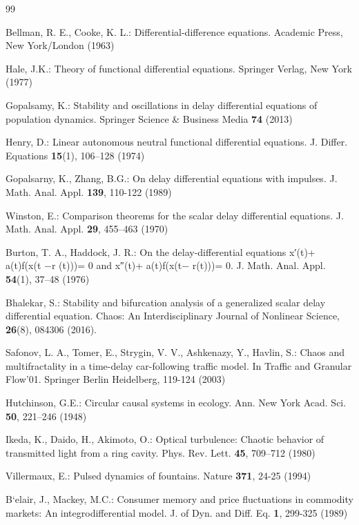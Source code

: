 \documentclass[12pt]{article}
\numberwithin{equation}{section}
\begin{document}
\begin{thebibliography}{99}

 Bellman, R. E., Cooke, K. L.: Differential-difference equations. Academic Press, New York/London (1963)

 Hale, J.K.: Theory of functional differential equations. Springer Verlag,
New York (1977)

 Gopalsamy, K.: Stability and oscillations in delay differential equations of population dynamics. Springer Science \& Business Media \textbf{74} (2013)

 Henry, D.: Linear autonomous neutral functional differential equations. J. Differ. Equations \textbf{15}(1), 106--128 (1974)

 Gopalsarny, K., Zhang, B.G.: On delay differential equations with impulses.
J. Math. Anal. Appl. \textbf{139}, 110-122 (1989)

 Winston, E.: Comparison theorems for the scalar delay differential equations.
J. Math. Anal. Appl. \textbf{29}, 455--463 (1970)

 Burton, T. A., Haddock, J. R.: On the delay-differential equations x′(t)+ a(t)f(x(t −r (t)))= 0 and x″(t)+ a(t)f(x(t− r(t)))= 0. J. Math. Anal. Appl. \textbf{54}(1), 37--48 (1976)

 Bhalekar, S.: Stability and bifurcation analysis of a generalized scalar delay differential equation. Chaos: An Interdisciplinary Journal of Nonlinear Science, \textbf{26}(8), 084306  (2016).

 Safonov, L. A., Tomer, E., Strygin, V. V., Ashkenazy, Y.,  Havlin, S.: Chaos and multifractality in a time-delay car-following traffic model. In Traffic and Granular Flow’01.
Springer Berlin Heidelberg,  119-124 (2003)

 Hutchinson, G.E.: Circular causal systems in ecology. Ann. New York Acad. Sci. \textbf{50}, 221--246 (1948)

 Ikeda, K., Daido, H., Akimoto, O.: Optical turbulence: Chaotic behavior of transmitted light from a ring cavity. Phys. Rev. Lett. \textbf{45}, 709--712 (1980)

 Villermaux, E.: Pulsed dynamics of fountains. Nature \textbf{371}, 24-25 (1994)

 B`elair, J., Mackey, M.C.: Consumer memory and price fluctuations in commodity markets: An integrodifferential model. J. of Dyn. and Diff. Eq. \textbf{1}, 299-325 (1989)


\end{thebibliography}
\end{document}
